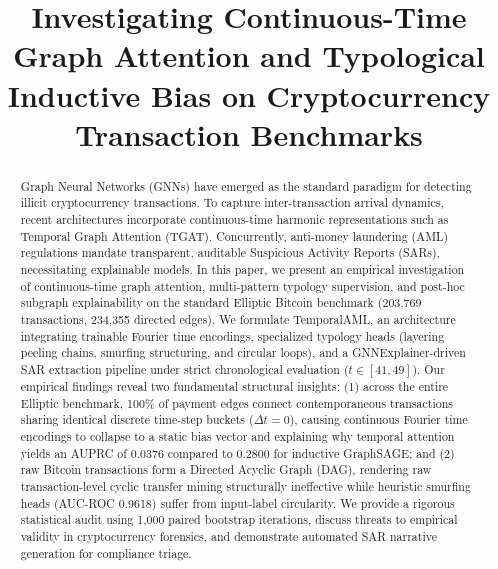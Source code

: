 \documentclass[conference]{IEEEtran}
\begin{document}
\title{Investigating Continuous-Time Graph Attention and Typological Inductive Bias on Cryptocurrency Transaction Benchmarks}

\author{
}

\maketitle

\begin{abstract}
Graph Neural Networks (GNNs) have emerged as the standard paradigm for detecting illicit cryptocurrency transactions. To capture inter-transaction arrival dynamics, recent architectures incorporate continuous-time harmonic representations such as Temporal Graph Attention (TGAT). Concurrently, anti-money laundering (AML) regulations mandate transparent, auditable Suspicious Activity Reports (SARs), necessitating explainable models. In this paper, we present an empirical investigation of continuous-time graph attention, multi-pattern typology supervision, and post-hoc subgraph explainability on the standard Elliptic Bitcoin benchmark (203,769 transactions, 234,355 directed edges). We formulate TemporalAML, an architecture integrating trainable Fourier time encodings, specialized typology heads (layering peeling chains, smurfing structuring, and circular loops), and a GNNExplainer-driven SAR extraction pipeline under strict chronological evaluation ($t \in [41, 49]$). Our empirical findings reveal two fundamental structural insights: (1) across the entire Elliptic benchmark, 100\% of payment edges connect contemporaneous transactions sharing identical discrete time-step buckets ($\Delta t = 0$), causing continuous Fourier time encodings to collapse to a static bias vector and explaining why temporal attention yields an AUPRC of 0.0376 compared to 0.2800 for inductive GraphSAGE; and (2) raw Bitcoin transactions form a Directed Acyclic Graph (DAG), rendering raw transaction-level cyclic transfer mining structurally ineffective while heuristic smurfing heads (AUC-ROC 0.9618) suffer from input-label circularity. We provide a rigorous statistical audit using 1,000 paired bootstrap iterations, discuss threats to empirical validity in cryptocurrency forensics, and demonstrate automated SAR narrative generation for compliance triage.
\end{abstract}
\end{document}

